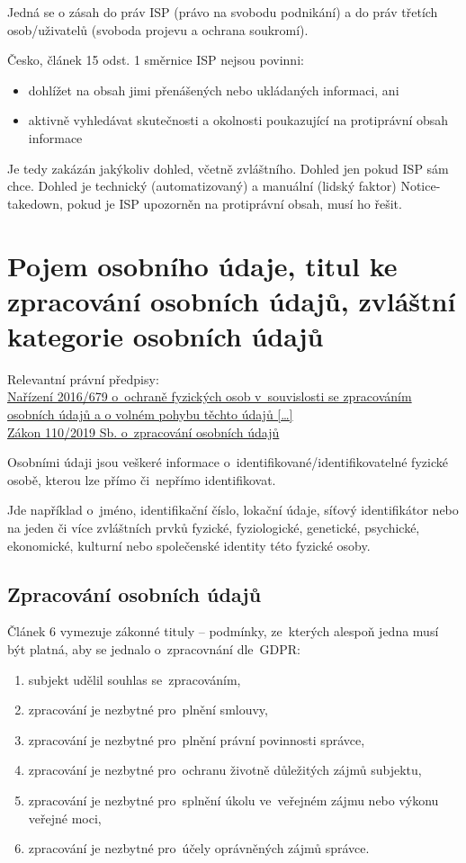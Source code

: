 Jedná se o zásah do práv ISP (právo na svobodu podnikání) a do práv třetích osob/uživatelů (svoboda projevu a ochrana soukromí).

Česko, článek 15 odst. 1 směrnice
ISP nejsou povinni:
\begin{itemize}
    \item dohlížet na obsah jimi přenášených nebo ukládaných informaci, ani
    \item aktivně vyhledávat skutečnosti a okolnosti poukazující na protiprávní obsah informace
\end{itemize}
Je tedy zakázán jakýkoliv dohled, včetně zvláštního. Dohled jen pokud ISP sám chce.
Dohled je technický (automatizovaný) a manuální (lidský faktor)
Notice-takedown, pokud je ISP upozorněn na protiprávní obsah, musí ho řešit.

\clearpage
\section{Pojem osobního údaje, titul ke zpracování osobních údajů, zvláštní kategorie osobních údajů}

{}Relevantní právní předpisy:
\\\href{https://eur-lex.europa.eu/legal-content/CS/ALL/?uri=CELEX:32016R0679
}{Nařízení 2016/679 o~ochraně fyzických osob v~souvislosti se zpracováním osobních údajů a o volném pohybu těchto údajů [\dots]}
\\\href{https://www.zakonyprolidi.cz/cs/2019-110}{Zákon 110/2019 Sb. o~zpracování osobních údajů}

Osobními údaji jsou veškeré informace o~identifikované/identifikovatelné fyzické osobě, kterou lze přímo či~nepřímo identifikovat.

Jde například o~jméno, identifikační číslo, lokační údaje, síťový identifikátor nebo na jeden či více zvláštních prvků fyzické, fyziologické, genetické, psychické, ekonomické, kulturní nebo společenské identity této fyzické osoby.

\subsection{Zpracování osobních údajů}

Článek 6 vymezuje zákonné tituly -- podmínky, ze~kterých alespoň jedna musí být platná, aby se jednalo o~zpracovnání dle~GDPR:

\begin{enumerate}[label=\alph*)]
\item subjekt udělil souhlas se~zpracováním,
\item zpracování je nezbytné pro~plnění smlouvy,
\item zpracování je nezbytné pro~plnění právní povinnosti správce,
\item zpracování je nezbytné pro~ochranu životně důležitých zájmů subjektu,
\item zpracování je nezbytné pro~splnění úkolu ve~veřejném zájmu nebo výkonu veřejné moci,
\item zpracování je nezbytné pro~účely oprávněných zájmů správce.
\end{enumerate}

